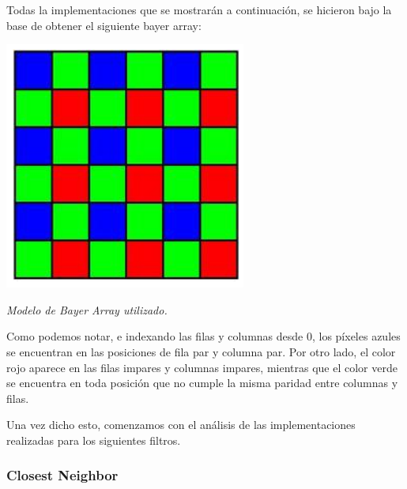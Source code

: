 \vspace{2\baselineskip}

Todas la implementaciones que se mostrarán a continuación, se hicieron bajo la base de obtener el siguiente bayer array:

	\par 
	\begin{center}
		\includegraphics[scale=0.4]{./img/bayerarray.png}
		\par 
		\footnotesize\textit{Modelo de Bayer Array utilizado.}
	\end{center}
	\par 
	
Como podemos notar, e indexando las filas y columnas desde 0, los píxeles azules se encuentran en las posiciones de fila par y columna par. Por otro lado, el color rojo aparece en las filas impares y columnas impares, mientras que el color verde se encuentra en toda posición que no cumple la misma paridad entre columnas y filas.
\par 
Una vez dicho esto, comenzamos con el análisis de las implementaciones realizadas para los siguientes filtros.
	
\subsubsection{Closest Neighbor}

